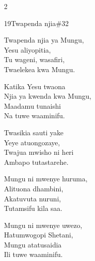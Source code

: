 \documentclass{article}
\begin{document}
\begin{multicols}{2}
\begin{hymn}{19}{Twapenda njia}{\#32}
\begin{stanza}
Twapenda njia ya Mungu,\\
Yesu aliyopitia,\\
Tu wageni, wasafiri,\\
Twaelekea kwa Mungu.
\end{stanza}
\begin{chorus}
Katika Yesu twaona\\
Njia ya kwenda kwa Mungu,\\
Maadamu tunaishi\\
Na tuwe waaminifu.
\end{chorus}
\begin{stanza}
Twasikia sauti yake\\
Yeye atuongozaye,\\
Twajua mwisho ni heri\\
Ambapo tutastarehe.
\end{stanza}
\begin{stanza}
Mungu ni mwenye huruma,\\
Alituona dhambini,\\
Akatuvuta nuruni,\\
Tutamsifu kila saa.
\end{stanza}
\begin{stanza}
Mungu ni mwenye uwezo,\\
Hatumwogopi Shetani,\\
Mungu atatusaidia\\
Ili tuwe waaminifu.
\end{stanza}
\end{hymn}


\end{multicols}
\end{document}
